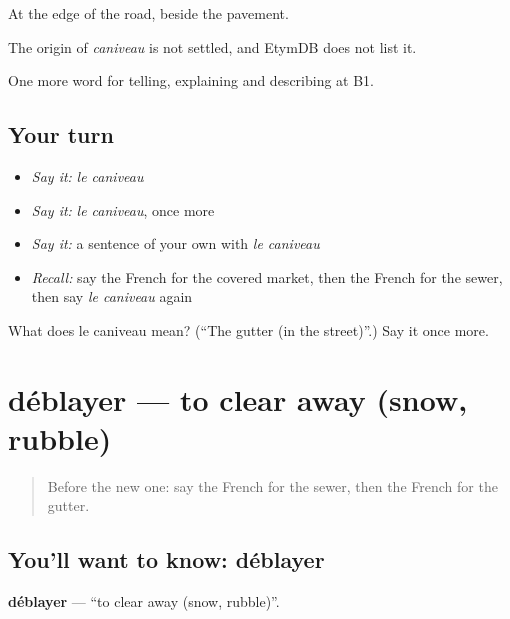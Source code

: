 At the edge of the road, beside the pavement.

\begin{cousinweb}
The origin of \emph{caniveau} is not settled, and EtymDB does not list it.
\end{cousinweb}

\begin{grammarlens}[title={What you've built}]
One more word for telling, explaining and describing at B1.
\end{grammarlens}

\subsection*{Your turn}
\begin{itemize}
\raggedright
  \item \emph{Say it:} \emph{le caniveau}
  \item \emph{Say it:} \emph{le caniveau}, once more
  \item \emph{Say it:} a sentence of your own with \emph{le caniveau}
  \item \emph{Recall:} say the French for the covered market, then the French for the sewer, then say \emph{le caniveau} again
\end{itemize}

\begin{tcolorbox}[breakable,colback=teal!4,colframe=teal!35!black,title={Before you move on}]
What does le caniveau mean? (\textquotedblleft{}The gutter (in the street)\textquotedblright{}.) Say it once more.
\end{tcolorbox}
\section[déblayer]{déblayer — to clear away (snow, rubble)}

\label{lesson:FR-C443-deblayer}



\begin{quote}
Before the new one: say the French for the sewer, then the French for the gutter.
\end{quote}

\subsection*{You'll want to know: déblayer}
\textbf{déblayer} — \textquotedblleft{}to clear away (snow, rubble)\textquotedblright{}.

